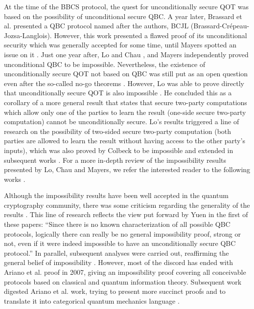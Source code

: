 At the time of the BBCS protocol, the quest for unconditionally secure QOT was based on the possibility of unconditional secure QBC. A year later, Brassard et al. presented a QBC protocol \cite{BCJL93} named after the authors, BCJL (Brassard-Crépeau-Jozsa-Langlois). However, this work presented a flawed proof of its unconditional security which was generally accepted for some time, until Mayers spotted an issue on it \cite{M96}. Just one year after, Lo and Chau \cite{LC97}, and Mayers \cite{M97} independently proved unconditional QBC to be impossible. Nevertheless, the existence of unconditionally secure QOT not based on QBC was still put as an open question \cite{BC96} even after the so-called no-go theorems \cite{LC97, M97}. However, Lo was able to prove directly that unconditionally secure QOT is also impossible \cite{L97}. He concluded this as a corollary of a more general result that states that secure two-party computations which allow only one of the parties to learn the result (one-side secure two-party computation) cannot be unconditionally secure. Lo's results triggered a line of research on the possibility of two-sided secure two-party computation (both parties are allowed to learn the result without having access to the other party's inputs), which was also proved by Colbeck to be impossible \cite{C07} and extended in subsequent works \cite{BCS12, SSS14, SJFHV13}. For a more in-depth review of the impossibility results presented by Lo, Chau and Mayers, we refer the interested reader to the following works \cite{BCMS97, S99}.

Although the impossibility results have been well accepted in the quantum cryptography community, there was some criticism regarding the generality of the results \cite{Y00, Y02, Y04, C03}. This line of research reflects the view put forward by Yuen \cite{Y00} in the first of these papers: ``Since there is no known characterization of all possible QBC protocols, logically there can really be no general impossibility proof, strong or not, even if it were indeed impossible to have an unconditionally secure QBC protocol.'' In parallel, subsequent analyses were carried out, reaffirming the general belief of impossibility \cite{B01, C05, Che07}. However, most of the discord has ended with Ariano et al. proof \cite{A07} in 2007, giving an impossibility proof covering all conceivable protocols based on classical and quantum information theory. Subsequent work digested Ariano et al. \cite{A07} work, trying to present more succinct proofs \cite{CAP10, CAPSW13, H13} and to translate it into categorical quantum mechanics language \cite{K12, SHW20, BK22}. 

